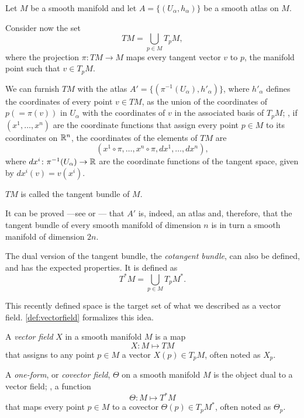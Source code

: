 \begin{definition}
	Let $M$ be a smooth manifold and let $A = \{(U_\alpha, h_\alpha)\}$ be a smooth atlas on $M$.
	
	Consider now the set
	\[
		TM = \bigcup_{p \in M} T_p M,
	\]
	where the projection $\pi \colon TM \to M$ maps every tangent vector $v$ to $p$, the manifold point such that $v \in T_p M$.

	We can furnish $TM$ with the atlas $A' = \{(\pi^{-1}(U_\alpha), h'_\alpha)\}$, where $h'_\alpha$ defines the coordinates of every point $v \in TM$, as the union of the coordinates of $p (= \pi(v))$ in $U_\alpha$ with the coordinates of $v$ in the associated basis of $T_p M$; \ie, if $(x^1, \dots, x^n)$ are the coordinate functions that assign every point $p \in M$ to its coordinates on $\mathbb{R}^n$, the coordinates of the elements of $TM$ are
	\[
		(x^1 \circ \pi, \dots, x^n \circ \pi, d{x^1}, \dots, d{x^n}),
	\]
	where $dx^i \colon \pi^{-1}(U_\alpha) \to \mathbb{R}$ are the coordinate functions of the tangent space, given by $dx^i(v) = v(x^i)$.
	
	$TM$ is called the tangent bundle of $M$.
\end{definition}

It can be proved ---see \cite[Example 2.1]{docarmo79} or \cite[pp. 26, 27]{oneill83}--- that $A'$ is, indeed, an atlas and, therefore, that the tangent bundle of every smooth manifold of dimension $n$ is in turn a smooth manifold of dimension $2n$.

\begin{remark}
	The dual version of the tangent bundle, the \emph{cotangent bundle}, can also be defined, and has the expected properties. It is defined as
	\[
		T^*M = \bigcup_{p \in M} T_p M^*.
	\]
\end{remark}

This recently defined space is the target set of what we described as a vector field. \autoref{def:vectorfield} formalizes this idea.

\begin{definition}
	\label{def:vectorfield}
	A \emph{vector field} $X$ in a smooth manifold $M$ is a map
	\[
		X \colon M \mapsto TM
	\]
	that assigns to any point $p \in M$ a vector $X(p) \in T_p M$, often noted as $X_p$.
\end{definition}

\begin{definition}
	A \emph{one-form}, or \emph{covector field}, $\Theta$ on a smooth manifold $M$ is the object dual to a vector field; \ie, a function
	\[
		\Theta \colon M \mapsto T^*M
	\]
	that maps every point $p \in M$ to a covector $\Theta(p) \in T_pM^*$, often noted as $\Theta_p$.
\end{definition}

